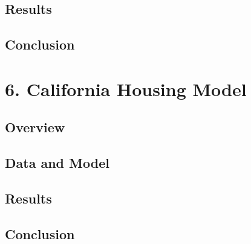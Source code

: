 \documentclass[
]{article}
\begin{document}
\hypertarget{results}{%
\subsection{Results}\label{results}}

\hypertarget{conclusion}{%
\subsection{Conclusion}\label{conclusion}}

\hypertarget{california-housing-model}{%
\section{6. California Housing Model}\label{california-housing-model}}

\hypertarget{overview-1}{%
\subsection{Overview}\label{overview-1}}

\hypertarget{data-and-model-1}{%
\subsection{Data and Model}\label{data-and-model-1}}

\hypertarget{results-1}{%
\subsection{Results}\label{results-1}}

\hypertarget{conclusion-1}{%
\subsection{Conclusion}\label{conclusion-1}}
\end{document}
